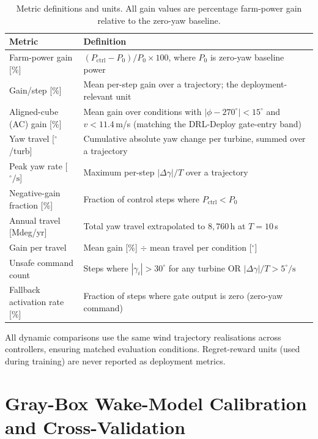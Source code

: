 \documentclass{article}
\begin{document}
\renewcommand{\arraystretch}{1.15}
\begin{table}[h]
\centering
\caption{Metric definitions and units. All gain values are percentage farm-power gain relative to the zero-yaw baseline.}
\label{tab:metric_defs}
\small
\begin{tabular}{lp{8cm}}
\toprule
Metric & Definition \\
\midrule
Farm-power gain [\%] & $(P_\mathrm{ctrl} - P_0) / P_0 \times 100$, where $P_0$ is zero-yaw baseline power \\
Gain/step [\%] & Mean per-step gain over a trajectory; the deployment-relevant unit \\
Aligned-cube (AC) gain [\%] & Mean gain over conditions with $|\phi{-}270^\circ|{<}15^\circ$ and $v{<}11.4$\,m/s (matching the DRL-Deploy gate-entry band) \\
Yaw travel [$^\circ$/turb] & Cumulative absolute yaw change per turbine, summed over a trajectory \\
Peak yaw rate [$^\circ\!/\!\mathrm{s}$] & Maximum per-step $|\Delta\gamma| / T$ over a trajectory \\
Negative-gain fraction [\%] & Fraction of control steps where $P_\mathrm{ctrl} < P_0$ \\
Annual travel [Mdeg/yr] & Total yaw travel extrapolated to $8{,}760$\,h at $T{=}10$\,s \\
Gain per travel & Mean gain [\%] $\div$ mean travel per condition [$^\circ$] \\
Unsafe command count & Steps where $|\gamma_i|{>}30^\circ$ for any turbine OR $|\Delta\gamma|/T{>}5^\circ\!/\!\mathrm{s}$ \\
Fallback activation rate [\%] & Fraction of steps where gate output is zero (zero-yaw command) \\
\bottomrule
\end{tabular}
\end{table}
\renewcommand{\arraystretch}{1.0}

All dynamic comparisons use the same wind trajectory realisations across controllers, ensuring matched evaluation conditions. Regret-reward units (used during training) are never reported as deployment metrics.

\section{Gray-Box Wake-Model Calibration and Cross-Validation}\label{sec:wake}
\end{document}
